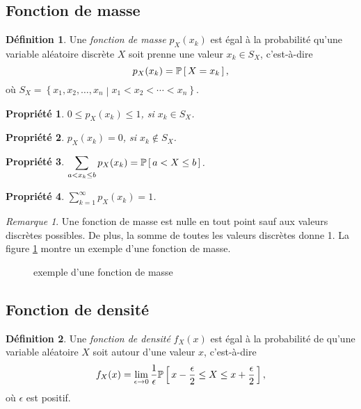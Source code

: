 \documentclass[11pt]{article}
\makeatletter
\renewcommand\P[1]{%
	\ensuremath{%
		\mathbb{P}\left[\,#1\,\right]%
	}%
}%
\newtheorem{property}{Propriété}
\theoremstyle{remark}
\newtheorem*{remark}{Remarque}
\theoremstyle{definition}
\newtheorem*{@definition}{Définition}
\newenvironment{definition}{%
	\begin{@definition}%
}{%
	\end{@definition}%
	\setcounter{property}{0}%
}
\makeatother
\begin{document}
\subsection{Fonction de masse}
\begin{definition}
	Une \textit{fonction de masse} $p_X(x_k)$ est égal à la probabilité qu'une
	variable aléatoire discrète $X$ soit prenne une valeur $x_k\in S_X$,
	c'est-à-dire 
	\begin{equation*}
		p_X(x_k)=\P{X=x_k},
	\end{equation*}
	où $S_X=\left\{x_1,x_2,\dots,x_n\middle\rvert x_1<x_2<\cdots<x_n\right\}$.
\end{definition}

\begin{property}
	$0\leq p_X(x_k)\leq 1$, si $x_k\in S_X$.
\end{property}

\begin{property}
	$p_X(x_k)=0$, si $x_k\notin S_X$.
\end{property}

\begin{property}
	$\displaystyle\sum_{a< x_k\leq b}p_X(x_k)=\P{a<X\leq b}$.
\end{property}\vspace{-6mm}

\begin{property}
	$\displaystyle\sum_{k=1}^\infty p_X(x_k)=1$.
\end{property}

\begin{remark}
	Une fonction de masse est nulle en tout point sauf aux valeurs discrètes
	possibles. De plus, la somme de toutes les valeurs discrètes donne 1. La
	figure \ref{fig:fonction_masse} montre un exemple d'une fonction de masse.
\end{remark}

\begin{figure}[H]
	\centering
	\caption{exemple d'une fonction de masse}
	
	\label{fig:fonction_masse}
\end{figure}

\subsection{Fonction de densité}
\begin{definition}
	Une \textit{fonction de densité} $f_X(x)$ est égal à la probabilité de
	qu'une variable aléatoire $X$ soit autour d'une valeur $x$, c'est-à-dire
	\begin{equation*}
		f_X(x)=\lim_{\epsilon\rightarrow 0}\frac{1}{\epsilon}
		\P{x-\frac{\epsilon}{2}\leq X\leq x+\frac{\epsilon}{2}},
	\end{equation*}
	où $\epsilon$ est positif.
\end{definition}
\end{document}
